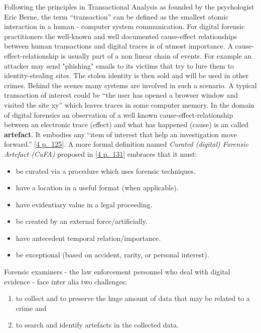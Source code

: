 Following the principles in Transactional Analysis as founded by the
psychologist Eric Berne, the term ``transaction'' can be defined as the
smal­lest atomic interaction in a human - computer system communication.
For digital forensic practitioners the well-known and well documented
cause-effect relationships between human transactions and digital traces
is of utmost importance. A cause-effect-relationship is usually part of
a non linear chain of events. For example an attacker may send
"phishing" emails to its victims that try to lure them to
identity-stealing sites. The stolen identity is then sold and will be
used in other crimes. Behind the scenes many systems are involved in
such a scenario. A typical transaction of interest could be ``the user
has opened a browser window and visited the site xy'' which leaves
traces in some computer memory. In the domain of digital forensics an
observation of a well known cause-effect-relationship between an
electronic trace (effect) and what has happened (cause) is an called
\textbf{artefact}. It embodies any ``item of interest that help an
investigation move forward.'' {[}\protect\hyperlink{harichandran2016}{4
p.~125}{]}. A more formal definition named \emph{Curated (digital)
Forensic Artefact (CuFA)} proposed in
{[}\protect\hyperlink{harichandran2016}{4 p.~131}{]} embraces that it
must:

\begin{itemize}
\item
  be curated via a procedure which uses forensic techniques.
\item
  have a location in a useful format (when applicable).
\item
  have evidentiary value in a legal proceeding.
\item
  be created by an external force/artificially.
\item
  have antecedent temporal relation/importance.
\item
  be exceptional (based on accident, rarity, or personal interest).
\end{itemize}

Forensic examiners - the law enforcement personnel who deal with digital
evidence - face inter alia two challenges:

\begin{enumerate}
\def\labelenumi{\arabic{enumi}.}
\item
  to collect and to preserve the huge amount of data that may be related
  to a crime and
\item
  to search and identify artefacts in the collected data.
\end{enumerate}

